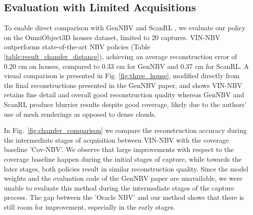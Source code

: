 \subsection{Evaluation with Limited Acquisitions}
\label{limited_capture_results}
\vspace{-0.25em}

To enable direct comparison with GenNBV and ScanRL \cite{qi2023my3dgen, peralta2020next}, we evaluate our policy on the OmniObject3D \cite{wu2023omniobject3d} houses dataset, limited to 20 captures. VIN-NBV outperforms state-of-the-art NBV policies (Table \ref{table:result_chamfer_distance}), achieving an average reconstruction error of 0.20 cm on houses, compared to 0.33 cm for GenNBV \cite{chen2024gennbv} and 0.37 cm for ScanRL. A visual comparison is presented in Fig. \ref{fig:three_house}, modified directly from the final reconstructions presented in the GenNBV \cite{chen2024gennbv} paper, and shows VIN-NBV retains fine detail and overall good reconstruction quality whereas GenNBV and ScanRL produce blurrier results despite good coverage, likely due to the authors' use of mesh renderings as opposed to dense clouds.


In Fig.~\ref{fig:chamfer_comparison} we compare the reconstruction accuracy during the intermediate stages of acquisition between VIN-NBV with the coverage baseline 'Cov-NBV'. We observe that large improvements with respect to the coverage baseline happen during the initial stages of capture, while towards the later stages, both policies result in similar reconstruction quality. Since the model weights and the evaluation code of the GenNBV \cite{chen2024gennbv} paper are unavailable, we were unable to evaluate this method during the intermediate stages of the capture process. The gap between the 'Oracle NBV' and our method shows that there is still room for improvement, especially in the early stages.

